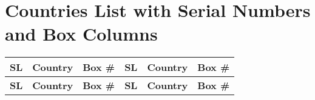 \documentclass[11pt]{article}
\begin{document}
\section*{Countries List with Serial Numbers and Box Columns}

\begin{longtable}{|>{\centering\arraybackslash}p{}|%
>{\raggedright\arraybackslash}p{}|%
p{}|%
>{\centering\arraybackslash}p{}|%
>{\raggedright\arraybackslash}p{}|%
p{}|}
\hline
\textbf{SL} & \textbf{Country} & \textbf{Box \#} & \textbf{SL} & \textbf{Country} & \textbf{Box \#} \\
\hline
\endfirsthead

\hline
\textbf{SL} & \textbf{Country} & \textbf{Box \#} & \textbf{SL} & \textbf{Country} & \textbf{Box \#} \\
\hline
\endhead


\end{longtable}
\end{document}
